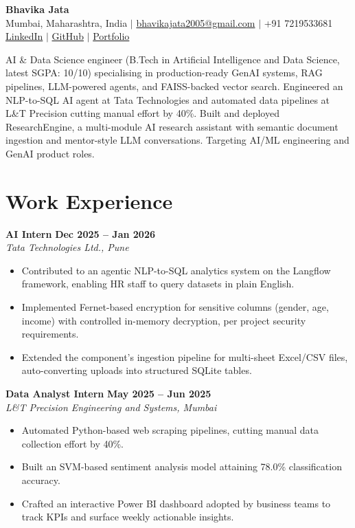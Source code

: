 \documentclass[9.5pt,letterpaper]{article}
\newcommand{\resumeItem}[1]{\item \small{#1}}
\newcommand{\resumeSubheading}[4]{
  \textbf{#1} \hfill \textbf{\small #2} \\[-1pt]
  \textit{\small#3} \hfill \textit{\small #4} \\[-2pt]
}
\begin{document}
\begin{center}
    {\LARGE \bfseries Bhavika Jata}\\[3pt]
    \small
    Mumbai, Maharashtra, India $|$ \href{mailto:bhavikajata2005@gmail.com}{bhavikajata2005@gmail.com} $|$ +91 7219533681 \\[1pt]
    \href{https://www.linkedin.com/in/bhavika-jata-2b9b6b303/}{LinkedIn} $|$
    \href{https://github.com/bhavika-bit}{GitHub} $|$
    \href{https://bhavika-bit.github.io/portfolio/}{Portfolio}
\end{center}

\vspace{-2pt}
\small
AI \& Data Science engineer (B.Tech in Artificial Intelligence and Data Science, latest SGPA: 10/10) specialising in production-ready GenAI systems, RAG pipelines, LLM-powered agents, and FAISS-backed vector search. Engineered an NLP-to-SQL AI agent at Tata Technologies and automated data pipelines at L\&T Precision cutting manual effort by 40\%. Built and deployed ResearchEngine, a multi-module AI research assistant with semantic document ingestion and mentor-style LLM conversations. Targeting AI/ML engineering and GenAI product roles.

\section{Work Experience}

\resumeSubheading
{AI Intern}{Dec 2025 -- Jan 2026}
{Tata Technologies Ltd., Pune}{}
\begin{itemize}
    \resumeItem{Contributed to an agentic NLP-to-SQL analytics system on the Langflow framework, enabling HR staff to query datasets in plain English.}
    \resumeItem{Implemented Fernet-based encryption for sensitive columns (gender, age, income) with controlled in-memory decryption, per project security requirements.}
    \resumeItem{Extended the component's ingestion pipeline for multi-sheet Excel/CSV files, auto-converting uploads into structured SQLite tables.}
\end{itemize}

\resumeSubheading
{Data Analyst Intern}{May 2025 -- Jun 2025}
{L\&T Precision Engineering and Systems, Mumbai}{}
\begin{itemize}
    \resumeItem{Automated Python-based web scraping pipelines, cutting manual data collection effort by 40\%.}
    \resumeItem{Built an SVM-based sentiment analysis model attaining 78.0\% classification accuracy.}
    \resumeItem{Crafted an interactive Power BI dashboard adopted by business teams to track KPIs and surface weekly actionable insights.}
\end{itemize}
\end{document}
